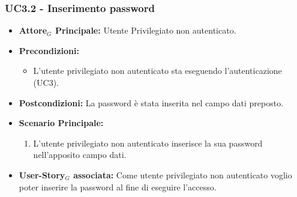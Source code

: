 \documentclass[11pt]{article}
\begin{document}
\begin{justify}
\subsubsection{\textbf{UC3.2 - Inserimento password}}
\begin{itemize}
     \item \textbf{Attore$_G$ Principale:} Utente Privilegiato non autenticato.
     \item \textbf{Precondizioni:} 
        \begin{itemize}
            \item L'utente privilegiato non autenticato sta eseguendo l'autenticazione (UC3).
        \end{itemize}
     \item \textbf{Postcondizioni:} La password è stata inserita nel campo dati preposto.
     \item \textbf{Scenario Principale:}
        \begin{enumerate}
            \item L'utente privilegiato non autenticato inserisce la sua password nell'apposito campo dati.
        \end{enumerate}
     \item \textbf{User-Story$_G$ associata:} Come utente privilegiato non autenticato voglio poter inserire la password al fine di eseguire l'accesso.
\end{itemize}

\end{justify}
\end{document}
